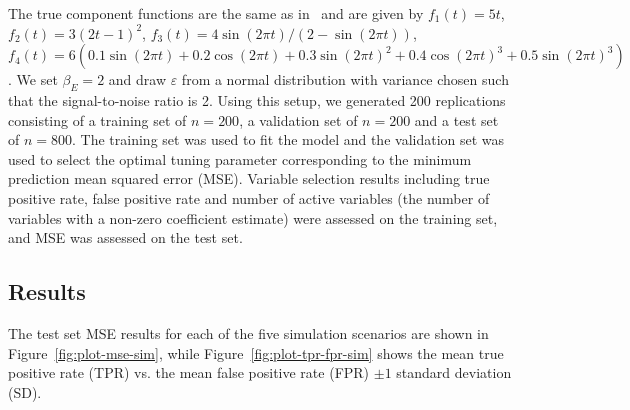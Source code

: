\documentclass[12pt,letter]{article}\usepackage[]{graphicx}\usepackage[]{color}
\begin{document}
The true component functions are the same as in~\citep{lin2006component,huang2010variable} and are given by $f_1(t) = 5t$, $f_2(t) = 3(2t-1)^2$, $f_3(t) = 4\sin(2\pi t) / (2-\sin(2\pi t))$, $f_4(t) = 6(0.1\sin(2\pi t) + 0.2 \cos(2\pi t)  + 0.3 \sin(2\pi t)^2 + 0.4\cos(2\pi t)^3+0.5\sin(2\pi t)^3)$. We set $\beta_E = 2$ and draw $\varepsilon$ from a normal distribution with variance chosen such that the signal-to-noise ratio is 2. Using this setup, we generated 200 replications consisting of a training set of $n=200$, a validation set of $n=200$ and a test set of $n=800$. The training set was used to fit the model and the validation set was used to select the optimal tuning parameter corresponding to the minimum prediction mean squared error (MSE). Variable selection results including true positive rate, false positive rate and number of active variables (the number of variables with a non-zero coefficient estimate) were assessed on the training set, and MSE was assessed on the test set. %

\subsection{Results}

The test set MSE results for each of the five simulation scenarios are shown in Figure~\ref{fig:plot-mse-sim}, while Figure~\ref{fig:plot-tpr-fpr-sim} shows the mean true positive rate (TPR) vs. the mean false positive rate (FPR) $\pm 1$ standard deviation (SD).
\end{document}
